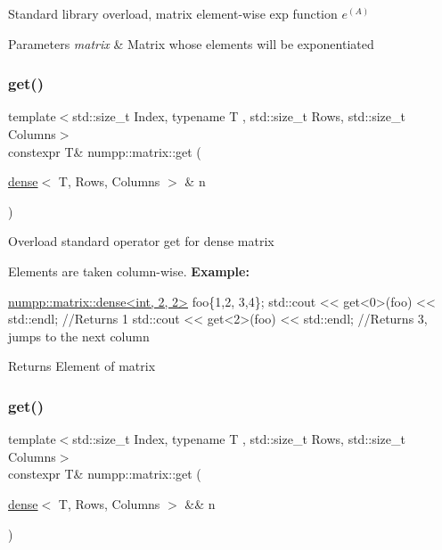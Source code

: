 Standard library overload, matrix element-\/wise exp function $e^(A)$


\begin{DoxyParams}{Parameters}
{\em matrix} & Matrix whose elements will be exponentiated\\
\hline
\end{DoxyParams}
\mbox{\label{group__numpp__structures__matrices__dense_gaa9d630e00d9adfc653c428dad39d1b56}} 
\subsubsection{\texorpdfstring{get()}{get()}\hspace{0.1cm}{\footnotesize\ttfamily [1/4]}}
{\footnotesize\ttfamily template$<$std\+::size\+\_\+t Index, typename T , std\+::size\+\_\+t Rows, std\+::size\+\_\+t Columns$>$ \\
constexpr T\& numpp\+::matrix\+::get (\begin{DoxyParamCaption}\item[{\hyperlink{classnumpp_1_1matrix_1_1dense}{dense}$<$ T, Rows, Columns $>$ \&}]{n }\end{DoxyParamCaption})}

Overload standard operator get for dense matrix

Elements are taken column-\/wise. {\bfseries Example\+:} 
\begin{DoxyCode}
\hyperlink{classnumpp_1_1matrix_1_1dense}{numpp::matrix::dense<int, 2, 2>} foo\{1,2,
                                    3,4\};
std::cout << get<0>(foo) << std::endl; \textcolor{comment}{//Returns 1}
std::cout << get<2>(foo) << std::endl; \textcolor{comment}{//Returns 3, jumps to the next column}
\end{DoxyCode}


\begin{DoxyReturn}{Returns}
Element of matrix
\end{DoxyReturn}
\mbox{\label{group__numpp__structures__matrices__dense_ga161ec12506af265f6c407b695b06974c}} 
\subsubsection{\texorpdfstring{get()}{get()}\hspace{0.1cm}{\footnotesize\ttfamily [2/4]}}
{\footnotesize\ttfamily template$<$std\+::size\+\_\+t Index, typename T , std\+::size\+\_\+t Rows, std\+::size\+\_\+t Columns$>$ \\
constexpr T\& numpp\+::matrix\+::get (\begin{DoxyParamCaption}\item[{\hyperlink{classnumpp_1_1matrix_1_1dense}{dense}$<$ T, Rows, Columns $>$ \&\&}]{n }\end{DoxyParamCaption})}

